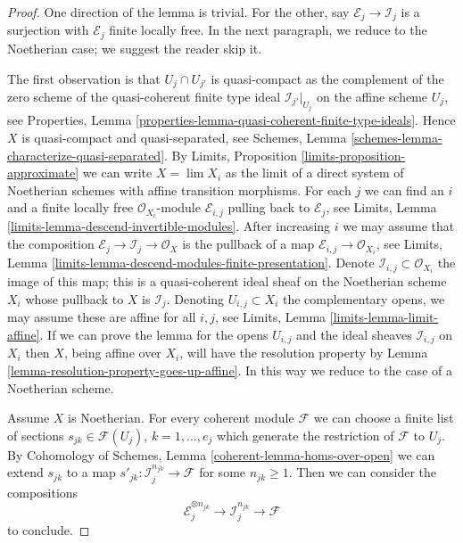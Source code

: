 \begin{proof}
One direction of the lemma is trivial. For the other, 
say $\mathcal{E}_j \to \mathcal{I}_j$ is a surjection with
$\mathcal{E}_j$ finite locally free. In the next paragraph, we
reduce to the Noetherian case; we suggest the reader skip it.

\medskip\noindent
The first observation is that $U_j \cap U_{j'}$ is quasi-compact
as the complement of the zero scheme of the quasi-coherent finite type ideal
$\mathcal{I}_{j'}|_{U_j}$ on the affine scheme $U_j$, see
Properties, Lemma \ref{properties-lemma-quasi-coherent-finite-type-ideals}.
Hence $X$ is quasi-compact and quasi-separated, see
Schemes, Lemma \ref{schemes-lemma-characterize-quasi-separated}.
By Limits, Proposition \ref{limits-proposition-approximate}
we can write $X = \lim X_i$ as the limit of a direct system of
Noetherian schemes with affine transition morphisms. For each $j$
we can find an $i$ and a finite locally free $\mathcal{O}_{X_i}$-module
$\mathcal{E}_{i, j}$ pulling back to $\mathcal{E}_j$, see
Limits, Lemma \ref{limits-lemma-descend-invertible-modules}.
After increasing $i$ we may assume that the composition
$\mathcal{E}_j \to \mathcal{I}_j \to \mathcal{O}_X$ is the
pullback of a map $\mathcal{E}_{i, j} \to \mathcal{O}_{X_i}$, see
Limits, Lemma \ref{limits-lemma-descend-modules-finite-presentation}.
Denote $\mathcal{I}_{i, j} \subset \mathcal{O}_{X_i}$ the image
of this map; this is a quasi-coherent ideal sheaf on the Noetherian
scheme $X_i$ whose pullback to $X$ is $\mathcal{I}_j$.
Denoting $U_{i, j} \subset X_i$ the complementary opens, we
may assume these are affine for all $i, j$, see
Limits, Lemma \ref{limits-lemma-limit-affine}.
If we can prove the lemma for the opens $U_{i, j}$ and the
ideal sheaves $\mathcal{I}_{i, j}$ on $X_i$ then $X$, being affine
over $X_i$, will have the resolution property by
Lemma \ref{lemma-resolution-property-goes-up-affine}.
In this way we reduce to the case of a Noetherian scheme.

\medskip\noindent
Assume $X$ is Noetherian. For every coherent module $\mathcal{F}$
we can choose a finite list of sections $s_{jk} \in \mathcal{F}(U_j)$,
$k = 1, \ldots, e_j$ which generate the restriction of $\mathcal{F}$ to $U_j$.
By Cohomology of Schemes, Lemma \ref{coherent-lemma-homs-over-open}
we can extend $s_{jk}$ to a map
$s'_{jk} : \mathcal{I}_j^{n_{jk}} \to \mathcal{F}$ for some $n_{jk} \geq 1$.
Then we can consider the compositions
$$
\mathcal{E}_j^{\otimes n_{jk}} \to \mathcal{I}_j^{n_{jk}} \to \mathcal{F}
$$
to conclude.
\end{proof}

